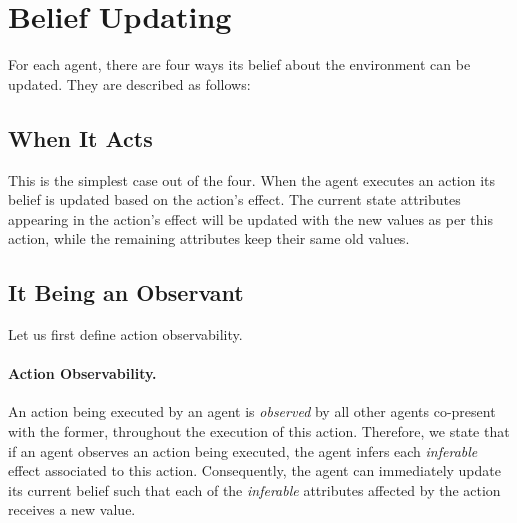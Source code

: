 \documentclass[letterpaper]{article} %
\newtheorem{definition}{Definition}
\begin{document}







\section{Belief Updating}
For each agent, there are four ways its belief about the environment can be updated. They are described as follows:

\subsection{When It Acts}
This is the simplest case out of the four. When the agent executes an action its belief is updated based on the action's effect. The current state attributes appearing in the action's effect will be updated with the new values as per this action, while the remaining attributes keep their same old values.  

\subsection{It Being an Observant}
Let us first define action observability.

\paragraph{Action Observability.}
An action being executed by an agent is \textit{observed} by all other agents co-present with the former, throughout the execution of this action.
Therefore, we state that if an agent observes an action being executed, 
the agent infers each \textit{inferable} effect associated to this action.
Consequently, the agent can immediately update its current belief such that each of the \textit{inferable} attributes affected by the action receives a new value.  
\end{document}
